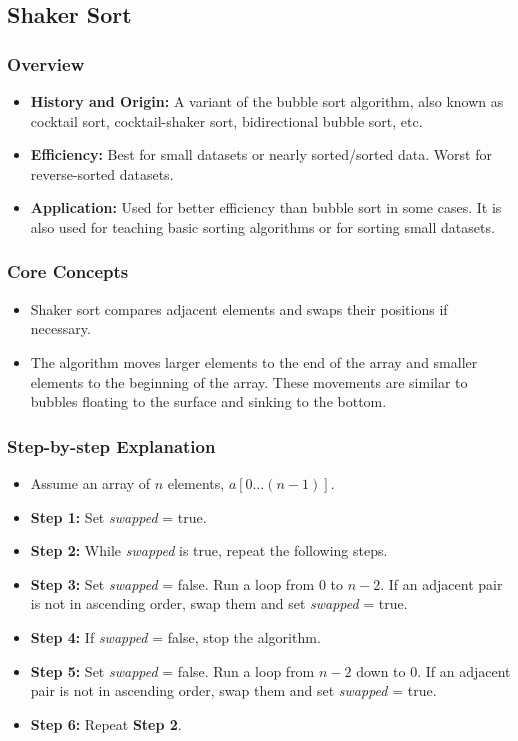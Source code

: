 \subsection[Shaker Sort]{Shaker Sort\cite{gfg_cocktailsort}}
    \subsubsection{Overview}
        \begin{itemize}
            \item \textbf{History and Origin:} A variant of the bubble sort algorithm, also known as cocktail sort, cocktail-shaker sort, bidirectional bubble sort, etc.
            \item \textbf{Efficiency:} Best for small datasets or nearly sorted/sorted data. Worst for reverse-sorted datasets.
            \item \textbf{Application:} Used for better efficiency than bubble sort in some cases. It is also used for teaching basic sorting algorithms or for sorting small datasets.
        \end{itemize}
    \subsubsection{Core Concepts}
        \begin{itemize}
            \item Shaker sort compares adjacent elements and swaps their positions if necessary.
            \item The algorithm moves larger elements to the end of the array and smaller elements to the beginning of the array. These movements are similar to bubbles floating to the surface and sinking to the bottom.
        \end{itemize}
    \subsubsection{Step-by-step Explanation}
        \begin{itemize}
            \item Assume an array of $n$ elements, $a[0 \ldots (n-1)]$.
            \item \textbf{Step 1:} Set \textit{swapped} = true.
            \item \textbf{Step 2:} While \textit{swapped} is true, repeat the following steps.
            \item \textbf{Step 3:} Set \textit{swapped} = false. Run a loop from $0$ to $n-2$. If an adjacent pair is not in ascending order, swap them and set \textit{swapped} = true.
            \item \textbf{Step 4:} If \textit{swapped} = false, stop the algorithm.
            \item \textbf{Step 5:} Set \textit{swapped} = false. Run a loop from $n-2$ down to $0$. If an adjacent pair is not in ascending order, swap them and set \textit{swapped} = true.
            \item \textbf{Step 6:} Repeat \textbf{Step 2}.
        \end{itemize}
